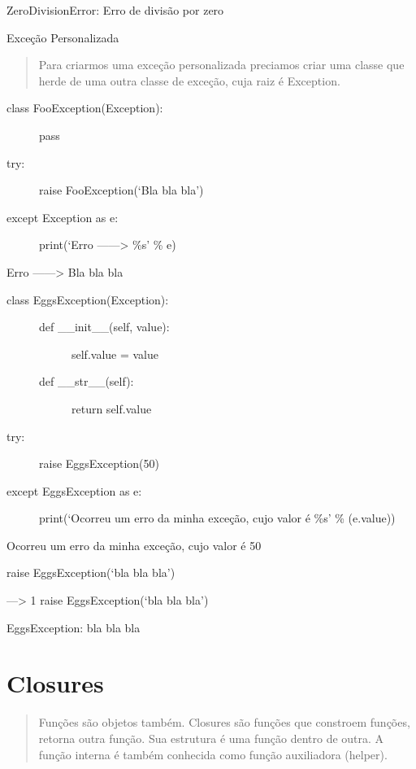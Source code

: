 \documentclass[letterpaper,10pt,brazil]{sphinxmanual}
\begin{document}
ZeroDivisionError: Erro de divisão por zero

Exceção Personalizada
\begin{quote}

Para criarmos uma exceção personalizada preciamos criar uma classe que herde de uma outra classe de exceção, cuja raiz é Exception.
\end{quote}
\begin{description}
\item[{class FooException(Exception):}] \leavevmode
pass

\item[{try:}] \leavevmode
raise FooException(‘Bla bla bla’)

\item[{except Exception as e:}] \leavevmode
print(‘Erro ——\textgreater{} \%s’ \% e)

\end{description}

Erro ——\textgreater{} Bla bla bla
\begin{description}
\item[{class EggsException(Exception):}] \leavevmode\begin{description}
\item[{def \_\_init\_\_(self, value):}] \leavevmode
self.value = value

\item[{def \_\_str\_\_(self):}] \leavevmode
return self.value

\end{description}

\item[{try:}] \leavevmode
raise EggsException(50)

\item[{except EggsException as e:}] \leavevmode
print(‘Ocorreu um erro da minha exceção, cujo valor é \%s’ \% (e.value))

\end{description}

Ocorreu um erro da minha exceção, cujo valor é 50

raise EggsException(‘bla bla bla’)

—\sphinxhyphen{}\textgreater{} 1 raise EggsException(‘bla bla bla’)

EggsException: bla bla bla


\chapter{Closures}
\label{\detokenize{content/closures:closures}}\label{\detokenize{content/closures::doc}}\begin{quote}

Funções são objetos também.
Closures são funções que constroem funções, retorna outra função.
Sua estrutura é uma função dentro de outra.
A função interna é também conhecida como função auxiliadora (helper).
\end{quote}
\end{document}
